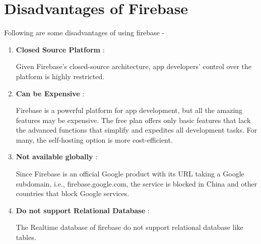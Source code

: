 \documentclass[12pt,a4paper]{report}
\begin{document}
\section{{\fontsize{16}{0}\selectfont Disadvantages of Firebase}}
{\fontsize{14}{0}\selectfont
\noindent
Following are some disadvantages of using firebase -
 
\vspace{.5cm}

\begin{enumerate}
  \item  \textbf{Closed Source Platform} :
  
  Given Firebase’s closed-source architecture, app developers’ control over the platform is highly restricted.
  \item  \textbf{Can be Expensive } :
  
   Firebase is a powerful platform for app development, but all the amazing features may be expensive. The free plan offers only basic features that lack the advanced functions that simplify and expedites all development tasks. For many, the self-hosting option is more cost-efficient.

  \item  \textbf{Not available globally} :
  
    Since Firebase is an official Google product with its URL taking a Google subdomain, i.e., firebase.google.com, the service is blocked in China and other countries that block Google services.

  \item  \textbf{Do not support Relational Database} :
  
    The Realtime database of firebase do not support relational database like tables. 

  



  
\end{enumerate}
}
 
\newpage
\end{document}
